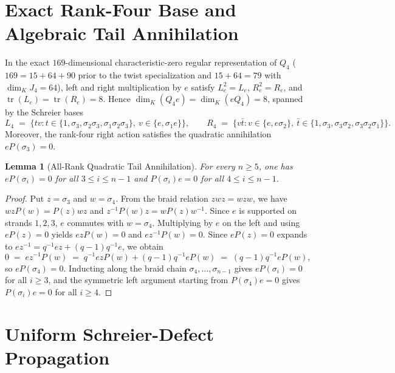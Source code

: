 \documentclass[10pt,reqno]{amsart}
\newtheorem{lemma}[theorem]{Lemma}
\theoremstyle{definition}
\begin{document}
\section{Exact Rank-Four Base and Algebraic Tail Annihilation}

In the exact $169$-dimensional characteristic-zero regular representation of $Q_4$ ($169 = 15 + 64 + 90$ prior to the twist specialization and $15+64=79$ with $\dim_K J_4=64$), left and right multiplication by $e$ satisfy $L_e^2=L_e$, $R_e^2=R_e$, and $\operatorname{tr}(L_e)=\operatorname{tr}(R_e)=8$. Hence $\dim_K(Q_4 e)=\dim_K(e Q_4)=8$, spanned by the Schreier bases
\[
  L_4 \;=\; \bigl\{t v : t\in\{1,\sigma_3,\sigma_2\sigma_3,\sigma_1\sigma_2\sigma_3\},\ v\in\{e,\sigma_1 e\}\bigr\},
  \qquad
  R_4 \;=\; \bigl\{v \bar{t} : v\in\{e,e\sigma_2\},\ \bar{t}\in\{1,\sigma_3,\sigma_3\sigma_2,\sigma_3\sigma_2\sigma_1\}\bigr\}.
\]
Moreover, the rank-four right action satisfies the quadratic annihilation $e P(\sigma_3) = 0$.

\begin{lemma}[All-Rank Quadratic Tail Annihilation]\label{lem:tail}
For every $n\ge 5$, one has $e P(\sigma_i) = 0$ for all $3\le i\le n-1$ and $P(\sigma_i) e = 0$ for all $4\le i\le n-1$.
\end{lemma}

\begin{proof}
Put $z=\sigma_3$ and $w=\sigma_4$. From the braid relation $zwz=wzw$, we have $wz P(w)=P(z)wz$ and $z^{-1}P(w)z = w P(z) w^{-1}$. Since $e$ is supported on strands $1,2,3$, $e$ commutes with $w=\sigma_4$. Multiplying by $e$ on the left and using $e P(z)=0$ yields $ez P(w)=0$ and $ez^{-1}P(w)=0$. Since $e P(z)=0$ expands to $ez^{-1} = q^{-1}ez + (q-1)q^{-1}e$, we obtain
\[
  0 \;=\; ez^{-1}P(w) \;=\; q^{-1}ez P(w) + (q-1)q^{-1}e P(w) \;=\; (q-1)q^{-1}e P(w),
\]
so $e P(\sigma_4)=0$. Inducting along the braid chain $\sigma_4,\dots,\sigma_{n-1}$ gives $e P(\sigma_i)=0$ for all $i\ge 3$, and the symmetric left argument starting from $P(\sigma_4)e=0$ gives $P(\sigma_i)e=0$ for all $i\ge 4$.
\end{proof}

\section{Uniform Schreier-Defect Propagation}
\end{document}
